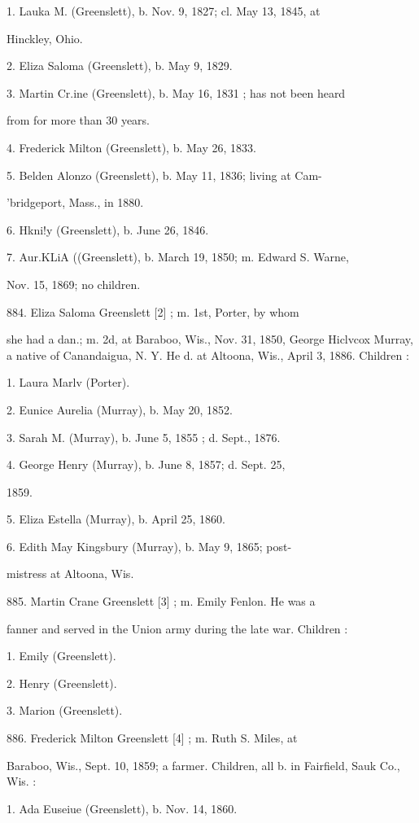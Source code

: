 \documentclass{book}
\begin{document}
1. Lauka M. (Greenslett), b. Nov. 9, 1827; cl. May 13, 1845, at 

Hinckley, Ohio. 

2. Eliza Saloma (Greenslett), b. May 9, 1829. 

3. Martin Cr.ine (Greenslett), b. May 16, 1831 ; has not been heard 

from for more than 30 years. 

4. Frederick Milton (Greenslett), b. May 26, 1833. 

5. Belden Alonzo (Greenslett), b. May 11, 1836; living at Cam- 

'bridgeport, Mass., in 1880. 

6. Hkni!y (Greenslett), b. June 26, 1846. 

7. Aur.KLiA ((Greenslett), b. March 19, 1850; m. Edward S. Warne, 

Nov. 15, 1869; no children. 

884. Eliza Saloma Greenslett [2] ; m. 1st, Porter, by whom 

she had a dan.; m. 2d, at Baraboo, Wis., Nov. 31, 1850, 
George Hiclvcox Murray, a native of Canandaigua, N. Y. He 
d. at Altoona, Wis., April 3, 1886. Children : 

1. Laura Marlv (Porter). 

2. Eunice Aurelia (Murray), b. May 20, 1852. 

3. Sarah M. (Murray), b. June 5, 1855 ; d. Sept., 1876. 

4. George Henry (Murray), b. June 8, 1857; d. Sept. 25, 

1859. 

5. Eliza Estella (Murray), b. April 25, 1860. 

6. Edith May Kingsbury (Murray), b. May 9, 1865; post- 

mistress at Altoona, Wis. 

885. Martin Crane Greenslett [3] ; m. Emily Fenlon. He was a 

fanner and served in the Union army during the late war. 
Children : 

1. Emily (Greenslett). 

2. Henry (Greenslett). 

3. Marion (Greenslett). 

886. Frederick Milton Greenslett [4] ; m. Ruth S. Miles, at 

Baraboo, Wis., Sept. 10, 1859; a farmer. Children, all b. in 
Fairfield, Sauk Co., Wis. : 

1. Ada Euseiue (Greenslett), b. Nov. 14, 1860. 
\end{document}
